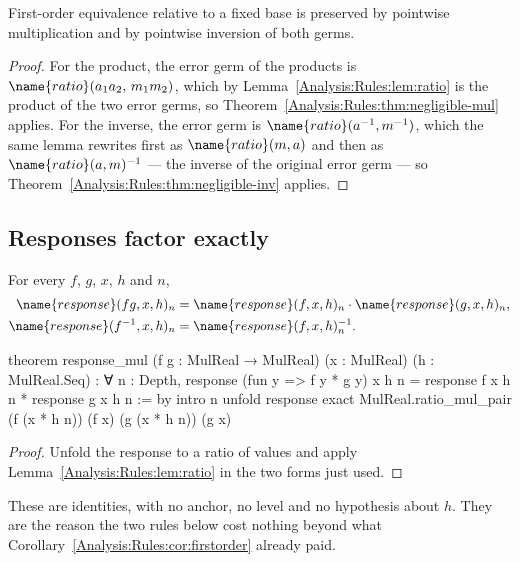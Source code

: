 \begin{corollary}
\label{Analysis:Rules:cor:firstorder}
First-order equivalence relative to a fixed base is preserved by pointwise
multiplication and by pointwise inversion of both germs.
\end{corollary}

\begin{proof}
For the product, the error germ of the products is
$\name{ratio}(a_1a_2,\, m_1m_2)$, which by
Lemma~\ref{Analysis:Rules:lem:ratio} is the product of the two error germs, so
Theorem~\ref{Analysis:Rules:thm:negligible-mul} applies.  For the inverse, the
error germ is $\name{ratio}(a^{-1},m^{-1})$, which the same lemma rewrites
first as $\name{ratio}(m,a)$ and then as $\name{ratio}(a,m)^{-1}$ --- the
inverse of the original error germ --- so
Theorem~\ref{Analysis:Rules:thm:negligible-inv} applies.
\end{proof}

\subsection{Responses factor exactly}

\begin{lemma}
\label{Analysis:Rules:lem:response}
For every $f$, $g$, $x$, $h$ and $n$,
\begin{align*}
  \name{response}(fg, x, h)_n
    &= \name{response}(f,x,h)_n \cdot \name{response}(g,x,h)_n, \\
  \name{response}(f^{-1},x,h)_n
    &= \name{response}(f,x,h)_n^{-1}.
\end{align*}
\end{lemma}

\begin{leancode}
theorem response_mul
    (f g : MulReal → MulReal) (x : MulReal) (h : MulReal.Seq) :
    ∀ n : Depth,
      response (fun y => f y * g y) x h n =
        response f x h n * response g x h n := by
  intro n
  unfold response
  exact MulReal.ratio_mul_pair
    (f (x * h n)) (f x)
    (g (x * h n)) (g x)
\end{leancode}

\begin{proof}
Unfold the response to a ratio of values and apply
Lemma~\ref{Analysis:Rules:lem:ratio} in the two forms just used.
\end{proof}

These are identities, with no anchor, no level and no hypothesis about $h$.
They are the reason the two rules below cost nothing beyond what
Corollary~\ref{Analysis:Rules:cor:firstorder} already paid.


